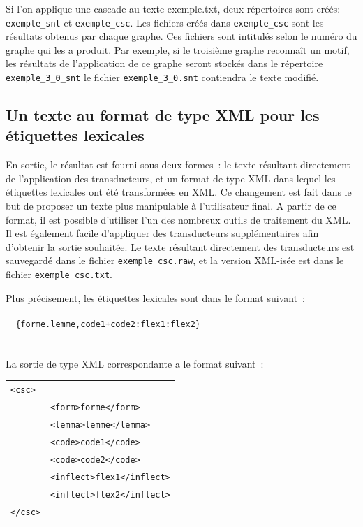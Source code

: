 Si l'on applique une cascade au texte exemple.txt, deux répertoires sont créés:
\verb+exemple_snt+ et \verb+exemple_csc+.
Les fichiers créés dans \verb+exemple_csc+ sont les résultats obtenus par
chaque graphe. Ces fichiers sont intitulés selon le numéro du graphe qui les a produit. Par exemple, si le
troisième graphe reconnaît un motif, les résultats de l'application de ce graphe seront stockés dans le 
répertoire  \verb+exemple_3+\newline\verb+_0_snt+ le fichier \verb+exemple_3_0.snt+ contiendra le texte modifié.

\subsection{Un texte au format de type XML pour les étiquettes lexicales}

En sortie, le résultat est fourni sous deux formes~: le texte résultant directement de l'application
des transducteurs, et un format de type XML dans lequel les étiquettes lexicales ont été transformées en XML.
Ce changement est fait dans le but de proposer un texte plus manipulable  à l'utilisateur final.
A partir de ce format, il est possible d'utiliser l'un des nombreux outils de traitement du XML.
Il est également facile d'appliquer des transducteurs supplémentaires afin d'obtenir la sortie souhaitée.
Le texte résultant directement des transducteurs est sauvegardé dans le fichier  \verb+exemple_csc.raw+,
et la version  XML-isée est dans le fichier \verb+exemple_csc.txt+.

Plus précisement, les étiquettes lexicales sont dans le format suivant~:\\
\begin{tabular}{c}
\texttt{
\{forme.lemme,code1+code2:flex1:flex2\}}
\end{tabular}\\
La sortie de type XML correspondante a le format suivant~:\\
\begin{tabular}{ll}
\texttt{<csc>}&\\
	&\texttt{<form>forme</form>}\\
	&\texttt{<lemma>lemme</lemma>}\\
	&\texttt{<code>code1</code>}\\
	&\texttt{<code>code2</code>}\\
	&\texttt{<inflect>flex1</inflect>}\\
	&\texttt{<inflect>flex2</inflect>}\\
\texttt{</csc>}&\\
\end{tabular}

